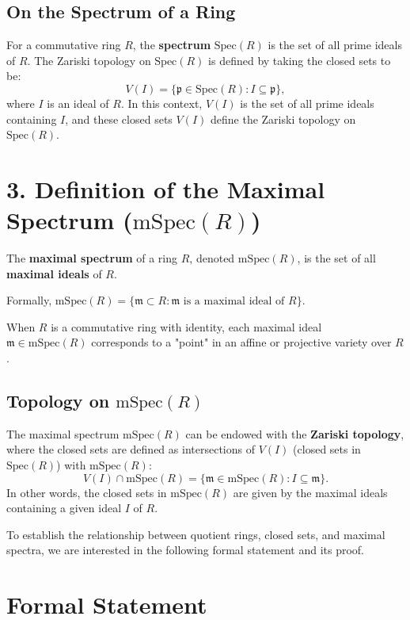 \documentclass[11pt,openany]{article}
\begin{document}
\subsection*{On the Spectrum of a Ring}

For a commutative ring \( R \), the \textbf{spectrum} \( \text{Spec}(R) \) is the set of all prime ideals of \( R \). The Zariski topology on \( \text{Spec}(R) \) is defined by taking the closed sets to be:
\[
V(I) = \{ \mathfrak{p} \in \text{Spec}(R) : I \subseteq \mathfrak{p} \},
\]
where \( I \) is an ideal of \( R \). In this context, \( V(I) \) is the set of all prime ideals containing \( I \), and these closed sets \( V(I) \) define the Zariski topology on \( \text{Spec}(R) \).

\section*{3. Definition of the Maximal Spectrum (\( \text{mSpec}(R) \))}

The \textbf{maximal spectrum} of a ring \( R \), denoted \( \text{mSpec}(R) \), is the set of all \textbf{maximal ideals} of \( R \).

Formally, \( \text{mSpec}(R) = \{ \mathfrak{m} \subset R : \mathfrak{m} \text{ is a maximal ideal of } R \} \).

When \( R \) is a commutative ring with identity, each maximal ideal \( \mathfrak{m} \in \text{mSpec}(R) \) corresponds to a "point" in an affine or projective variety over \( R \).

\subsection*{Topology on \( \text{mSpec}(R) \)}

The maximal spectrum \( \text{mSpec}(R) \) can be endowed with the \textbf{Zariski topology}, where the closed sets are defined as intersections of \( V(I) \) (closed sets in \( \text{Spec}(R) \)) with \( \text{mSpec}(R) \):
\[
V(I) \cap \text{mSpec}(R) = \{ \mathfrak{m} \in \text{mSpec}(R) : I \subseteq \mathfrak{m} \}.
\]
In other words, the closed sets in \( \text{mSpec}(R) \) are given by the maximal ideals containing a given ideal \( I \) of \( R \).

\newpage
To establish the relationship between quotient rings, closed sets, and maximal spectra, we are interested in the following formal statement and its proof.

\section*{Formal Statement}
\end{document}
